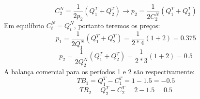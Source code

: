 \documentclass{article}
\begin{document}
\begin{equation*}
    C_2^N = \frac{1}{2p_2}(Q_1^T+Q_2^T) \to p_2=\frac{1}{2C_2^N}(Q_1^T+Q_2^T)
\end{equation*}
Em equilíbrio $C_t^N=Q_t^N$, portanto teremos os preços:
\begin{equation*}
    p_1=\frac{1}{2Q_1^N}(Q_1^T+Q_2^T) = \frac{1}{2*4}(1+2)=0.375
\end{equation*}
\begin{equation*}
    p_2=\frac{1}{2Q_2^N}(Q_1^T+Q_2^T) = \frac{1}{2*3}(1+2)=0.5
\end{equation*}
A balança comercial para os períodos 1 e 2 são respectivamente:
\begin{equation*}
    TB_1=Q_1^T-C_1^T = 1 - 1.5 = -0.5
\end{equation*}
\begin{equation*}
    TB_2=Q_2^T-C_2^T = 2 - 1.5 = 0.5
\end{equation*}
\end{document}
